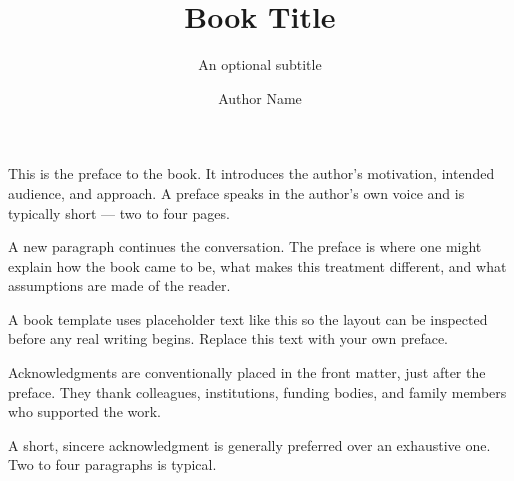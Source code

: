 \documentclass[12pt,twoside,b5paper]{book}
\begin{document}
\frontmatter
{}
\pagestyle{frontmatterstyle}


\title{Book Title}
\subtitle{An optional subtitle}
\author{Author Name}
\date{\the\year}


\booktitlepage





\booktoc
\cleardoublepage


This is the preface to the book. It introduces the author's motivation, intended audience, and approach. A preface speaks in the author's own voice and is typically short --- two to four pages.

A new paragraph continues the conversation. The preface is where one might explain how the book came to be, what makes this treatment different, and what assumptions are made of the reader.

A book template uses placeholder text like this so the layout can be inspected before any real writing begins. Replace this text with your own preface.

\cleardoublepage


Acknowledgments are conventionally placed in the front matter, just after the preface. They thank colleagues, institutions, funding bodies, and family members who supported the work.

A short, sincere acknowledgment is generally preferred over an exhaustive one. Two to four paragraphs is typical.

\cleardoublepage


\mainmatter
\pagestyle{chapterstyle}
\end{document}
